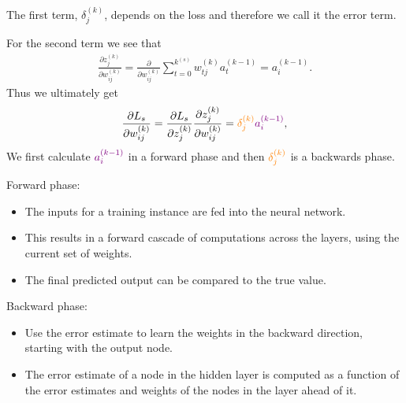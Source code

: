 \documentclass[aspectratio=169,10pt]{beamer}
\begin{document}
\begin{frame}{\secname}{\subsecname}
  The first term, $\delta_j^{(k)}$, depends on the loss and therefore we call it the error term.

  For the second term we see that
  \begin{align}
    \frac{\partial z_j^{(k)}}{\partial w_{ij}^{(k)}} = \frac{\partial}{\partial w_{ij}^{(k)}} \sum_{t=0}^{k^{(s)}} w_{tj}^{(k)} a_t^{(k-1)} = a_i^{(k-1)}.
  \end{align}
  Thus we ultimately get
  \begin{align}
    \frac{\partial L_s}{\partial w_{ij}^{(k)}} = \frac{\partial L_s}{\partial z_j^{(k)}}\frac{\partial z_j^{(k)}}{\partial w_{ij}^{(k)}} = {\color{orange}\delta_j^{(k)}}{\color{violet}a_i^{(k-1)}},
  \end{align}
  We first calculate ${\color{violet}a_i^{(k-1)}}$ in a forward phase and then ${\color{orange}\delta_j^{(k)}}$ is a backwards phase.
\end{frame}

\begin{frame}{\secname}{\subsecname}
  {\color{violet}Forward phase}: 
  \begin{itemize}
      \item The inputs for a training instance are fed into the neural network. 
      \item This results in a forward cascade of computations across the layers, using the current set of weights. 
      \item The final predicted output can be compared to the true value. 
  \end{itemize}

  {\color{orange}Backward phase}: 
  \begin{itemize}
      \item Use the error estimate to learn the weights in the backward direction, starting with the output node. 
      \item The error estimate of a node in the hidden layer is computed as a function of the error estimates and weights of the nodes in the layer ahead of it. 
  \end{itemize}
\end{frame}
\end{document}
